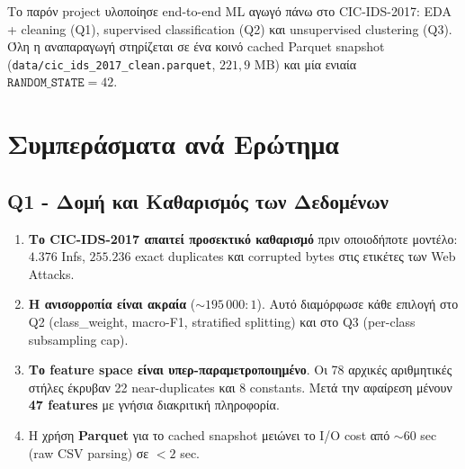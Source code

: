 \documentclass[12pt,a4paper,twoside]{book}
\begin{document}
Το παρόν project υλοποίησε end-to-end ML αγωγό πάνω στο CIC-IDS-2017:
EDA + cleaning (Q1), supervised classification (Q2) και unsupervised
clustering (Q3). Όλη η αναπαραγωγή στηρίζεται σε ένα κοινό cached
Parquet snapshot (\texttt{data/cic\_ids\_2017\_clean.parquet},
\(221{,}9\) MB) και μία ενιαία \(\texttt{RANDOM\_STATE} = 42\).

\section{Συμπεράσματα ανά Ερώτημα}

\subsection{Q1 - Δομή και Καθαρισμός των Δεδομένων}
\begin{enumerate}
    \item \textbf{Το CIC-IDS-2017 απαιτεί προσεκτικό καθαρισμό} πριν
    οποιοδήποτε μοντέλο: \(4.376\) Infs, \(255.236\) exact duplicates και
    corrupted bytes στις ετικέτες των Web Attacks.
    \item \textbf{Η ανισορροπία είναι ακραία} (\(\sim 195\,000:1\)). Αυτό
    διαμόρφωσε κάθε επιλογή στο Q2 (class\_weight, macro-F1, stratified
    splitting) και στο Q3 (per-class subsampling cap).
    \item \textbf{Το feature space είναι υπερ-παραμετροποιημένο}. Οι 78
    αρχικές αριθμητικές στήλες έκρυβαν 22 near-duplicates και 8 constants.
    Μετά την αφαίρεση μένουν \textbf{47 features} με γνήσια διακριτική
    πληροφορία.
    \item Η χρήση \textbf{Parquet} για το cached snapshot μειώνει το I/O
    cost από \(\sim 60\) sec (raw CSV parsing) σε \(<2\) sec.
\end{enumerate}
\end{document}

